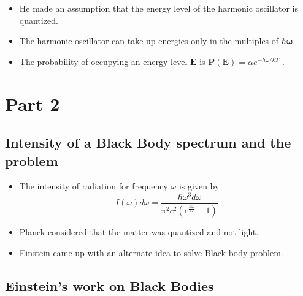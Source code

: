 \documentclass[aspectratio=169]{beamer}
\begin{document}
\begin{frame}{}

	\begin{itemize}

		\item He made an assumption that the energy level of the harmonic oscillator is quantized.  \newline
		\item The harmonic oscillator can take up energies only in the multiples of $ \mathbf{\hbar \omega} $.  \newline
		\item The probability of occupying an energy level $\mathbf{E}$ is {\large $\mathbf{P(E)} = \alpha e^{-\hbar \omega / kT}$} . 
	\end{itemize}
	
\end{frame}

\section{\textbf{Part 2}}

\subsection{Intensity of a Black Body spectrum and the problem}

\begin{frame}{}

	\begin{itemize}

		\item The intensity of radiation for frequency $\omega$ is given by \[I(\omega)d\omega = \frac{\hbar \omega^3 d\omega}{ \pi^2 c^2 \left(e^{\frac{\hbar \omega}{kT}}-1 \right) } \] \newline
		\item Planck considered that the matter was quantized and not light. \newline
		\item Einstein came up with an alternate idea to solve Black body problem.
		 
	\end{itemize}
	
\end{frame}

\subsection{Einstein's work on Black Bodies}
\end{document}

